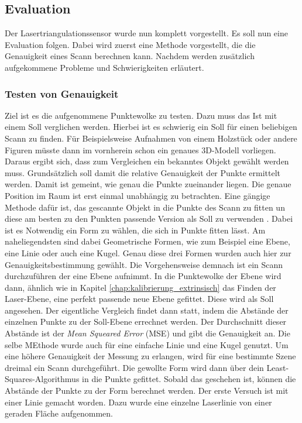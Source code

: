 	\subsection{Evaluation}
		
		Der Lasertriangulationssensor wurde nun komplett vorgestellt. Es soll nun eine Evaluation folgen. Dabei wird zuerst eine Methode vorgestellt, die die Genauigkeit eines Scann berechnen kann. Nachdem werden zusätzlich aufgekommene Probleme und Schwierigkeiten erläutert.   
		\subsubsection{Testen von Genauigkeit}
		Ziel ist es die aufgenommene Punktewolke zu testen. Dazu muss das \glqq Ist\grqq{} mit einem \glqq Soll\grqq{} verglichen werden. Hierbei ist es schwierig ein \glqq Soll\grqq{} für einen beliebigen Scann zu finden. Für Beispielsweise Aufnahmen von einem Holzstück oder andere Figuren müsste dann im vornherein schon ein genaues 3D-Modell vorliegen. Daraus ergibt sich, dass zum Vergleichen ein bekanntes Objekt gewählt werden muss. Grundsätzlich soll damit die relative Genauigkeit der Punkte ermittelt werden. Damit ist gemeint, wie genau die Punkte zueinander liegen. Die genaue Position im Raum ist erst einmal unabhängig zu betrachten. Eine gängige Methode dafür ist, das gescannte Objekt in die Punkte des Scann zu fitten un diese am besten zu den Punkten passende Version als \glqq Soll\grqq{} zu verwenden \citep{bart_accuracy_nodate} \citep{song_multi-view_2019}. Dabei ist es Notwendig ein Form zu wählen, die sich in Punkte fitten lässt. Am naheliegendsten sind dabei Geometrische Formen, wie zum Beispiel eine Ebene, eine Linie oder auch eine Kugel. Genau diese drei Formen wurden auch hier zur Genauigkeitsbestimmung gewählt. Die Vorgehensweise demnach ist ein Scann durchzuführen der eine Ebene aufnimmt. In die Punktewolke der Ebene wird dann, ähnlich wie in Kapitel \ref{chap:kalibrierung_extrinsisch} das Finden der Laser-Ebene, eine perfekt passende neue Ebene gefittet. Diese wird als \glqq Soll\grqq{} angesehen. Der eigentliche Vergleich findet dann statt, indem die Abstände der einzelnen Punkte zu der \glqq Soll\grqq-Ebene errechnet werden. Der Durchschnitt dieser Abstände ist der \textit{Mean Squeared Error} (MSE) und gibt die Genauigkeit an. Die selbe MEthode wurde auch für eine einfache Linie und eine Kugel genutzt. Um eine höhere Genauigkeit der Messung zu erlangen, wird für eine bestimmte Szene dreimal ein Scann durchgeführt. Die gewollte Form wird dann über dein Least-Squares-Algorithmus in die Punkte gefittet. Sobald das geschehen ist, können die Abstände der Punkte zu der Form berechnet werden. Der erste Versuch ist mit einer Linie gemacht worden. Dazu wurde eine einzelne Laserlinie von einer geraden Fläche aufgenommen.  
		
